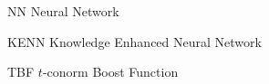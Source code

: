 \begin{abbreviations}
\item[NN] Neural Network
\item[KENN] Knowledge Enhanced Neural Network
\item[TBF] $t$-conorm Boost Function
\end{abbreviations}

